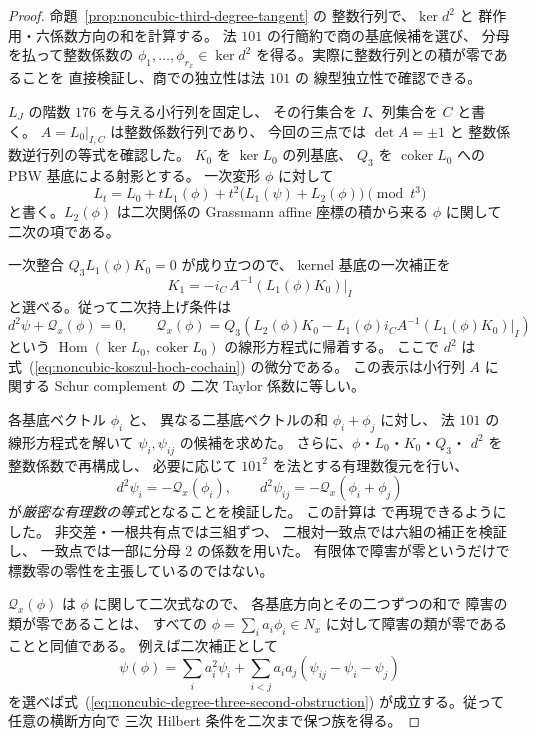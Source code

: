\begin{proof}
命題~\ref{prop:noncubic-third-degree-tangent} の
整数行列で、$\ker d^2$ と
群作用・六係数方向の和を計算する。
法 $101$ の行簡約で商の基底候補を選び、
分母を払って整数係数の
$\phi_1,\ldots,\phi_{r_x}\in\ker d^2$
を得る。実際に整数行列との積が零であることを
直接検証し、商での独立性は法 $101$ の
線型独立性で確認できる。

$L_J$ の階数 $176$ を与える小行列を固定し、
その行集合を $I$、列集合を $C$ と書く。
$A=L_0|_{I,C}$ は整数係数行列であり、
今回の三点では $\det A=\pm1$ と
整数係数逆行列の等式を確認した。
$K_0$ を $\ker L_0$ の列基底、
$Q_3$ を $\operatorname{coker}L_0$ への
PBW 基底による射影とする。
一次変形 $\phi$ に対して
\[
 L_t=L_0+tL_1(\phi)
      +t^2\bigl(L_1(\psi)+L_2(\phi)\bigr)
      \pmod{t^3}
\]
と書く。$L_2(\phi)$ は二次関係の
Grassmann affine 座標の積から来る
$\phi$ に関して二次の項である。

一次整合 $Q_3L_1(\phi)K_0=0$ が成り立つので、
kernel 基底の一次補正を
\[
 K_1=-i_C\,A^{-1}(L_1(\phi)K_0)|_I
\]
と選べる。従って二次持上げ条件は
\[
 d^2\psi+
 \mathcal Q_x(\phi)=0,\qquad
 \mathcal Q_x(\phi)
  =Q_3\left(
      L_2(\phi)K_0
      -L_1(\phi)i_CA^{-1}(L_1(\phi)K_0)|_I
      \right)
 \tag{NC-Ob2}\label{eq:noncubic-degree-three-second-obstruction}
\]
という $\operatorname{Hom}(\ker L_0,\operatorname{coker}L_0)$
の線形方程式に帰着する。
ここで $d^2$ は式~(\ref{eq:noncubic-koszul-hoch-cochain})
の微分である。
この表示は小行列 $A$ に関する Schur complement の
二次 Taylor 係数に等しい。

各基底ベクトル $\phi_i$ と、
異なる二基底ベクトルの和 $\phi_i+\phi_j$ に対し、
法 $101$ の線形方程式を解いて
$\psi_i,\psi_{ij}$ の候補を求めた。
さらに、$\phi$・$L_0$・$K_0$・$Q_3$・
$d^2$ を整数係数で再構成し、
必要に応じて $101^2$ を法とする有理数復元を行い、
\[
 d^2\psi_i=-\mathcal Q_x(\phi_i),\qquad
 d^2\psi_{ij}=-\mathcal Q_x(\phi_i+\phi_j)
\]
が\emph{厳密な有理数の等式}となることを検証した。
この計算は
で再現できるようにした。
非交差・一根共有点では三組ずつ、
二根対一致点では六組の補正を検証し、
一致点では一部に分母 $2$ の係数を用いた。
有限体で障害が零というだけで
標数零の零性を主張しているのではない。

$\mathcal Q_x(\phi)$ は $\phi$ に関して二次式なので、
各基底方向とその二つずつの和で
障害の類が零であることは、
すべての
$\phi=\sum_i a_i\phi_i\in N_x$
に対して障害の類が零であることと同値である。
例えば二次補正として
\[
 \psi(\phi)=
 \sum_i a_i^2\psi_i
 +\sum_{i<j}a_ia_j(\psi_{ij}-\psi_i-\psi_j)
\]
を選べば式~(\ref{eq:noncubic-degree-three-second-obstruction})
が成立する。従って任意の横断方向で
三次 Hilbert 条件を二次まで保つ族を得る。
\end{proof}

